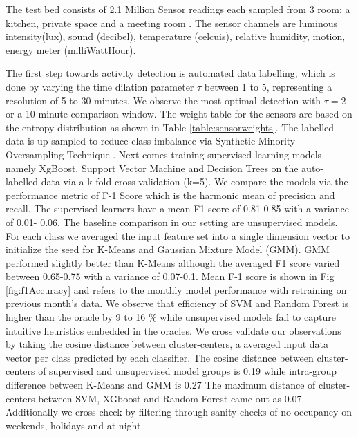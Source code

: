 \documentclass[conference]{IEEEtran}
\begin{document}
The test bed consists of 2.1 Million Sensor readings each sampled from 3 room: a kitchen, private space and a meeting room . The sensor channels are luminous intensity(lux), sound (decibel), temperature (celcuis), relative humidity, motion, energy meter (milliWattHour). 

The first step towards activity detection is automated data labelling, which is done by varying the time dilation parameter $\tau$ between 1 to 5, representing a resolution of 5 to 30 minutes. We observe the most optimal detection with $\tau = 2$ or a 10 minute comparison window. The weight table for the sensors are based on the entropy distribution as shown in Table \ref{table:sensorweights}. The labelled data is up-sampled to reduce class imbalance via Synthetic Minority Oversampling Technique \cite{chawla2002smote}. Next comes training supervised learning models namely XgBoost, Support Vector Machine and Decision Trees on the auto-labelled data via a k-fold cross validation (k=5). We compare the models via the performance metric of F-1 Score which is the harmonic mean of precision and recall. The supervised learners have a mean F1 score of 0.81-0.85 with a variance of 0.01- 0.06. The baseline comparison in our setting are unsupervised models. For each class we averaged the input feature set into a single dimension vector to initialize the seed for K-Means and Gaussian Mixture Model (GMM). GMM performed slightly better than K-Means although the averaged F1 score varied between 0.65-0.75 with a variance of 0.07-0.1. Mean F-1 score is shown in Fig \ref{fig:f1Accuracy} and refers to the monthly model performance with retraining on previous month's data. We observe that efficiency of SVM and Random Forest is higher than the oracle by 9 to 16 $\%$ while unsupervised models fail to capture intuitive heuristics embedded in the oracles. We cross validate our observations by taking the cosine distance between cluster-centers, a averaged input data vector per class predicted by each classifier. The cosine distance between cluster-centers of supervised and unsupervised model groups is 0.19 while intra-group difference between K-Means and GMM is 0.27  The maximum distance of cluster-centers between SVM, XGboost and Random Forest came out as 0.07. Additionally we cross check by filtering through sanity checks of no occupancy on weekends, holidays and at night.
\end{document}
